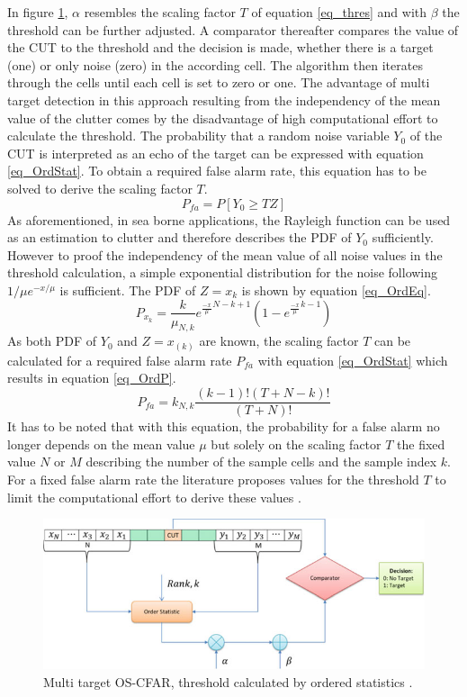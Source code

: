    In figure \ref{fig_StatCFAR}, $\alpha$ resembles the scaling factor $T$ of equation \ref{eq_thres} and with $\beta$ the threshold can be further adjusted. A comparator thereafter compares the value of the \ac{CUT} to the threshold and the decision is made, whether there is a target (one) or only noise (zero) in the according cell. The algorithm then iterates through the cells until each cell is set to zero or one. The advantage of multi target detection in this approach resulting from the independency of the mean value of the clutter comes by the disadvantage of high computational effort to calculate the threshold. The probability that a random noise variable $Y_0$ of the \ac{CUT} is interpreted as an echo of the target can be expressed with equation \ref{eq_OrdStat}. To obtain a required false alarm rate, this equation has to be solved to derive the scaling factor $T$. 
   \begin{equation}
   P_{fa}=P[Y_0\geq TZ]
   \label{eq_OrdStat}
   \end{equation}
   As aforementioned, in sea borne applications, the Rayleigh function can be used as an estimation to clutter and therefore describes the \ac{PDF} of $Y_0$ sufficiently. However to proof the independency of the mean value of all noise values in the threshold calculation, a simple exponential distribution for the noise following $1/\mu e^{-x/\mu}$ is sufficient. The \ac{PDF} of $Z=x_k$ is shown by equation \ref{eq_OrdEq}.
   \begin{equation}
   P_{x_k}= \frac{k}{\mu_{N,k}}{e^{\frac{-x}{\mu}}}^{N-k+1}({1-e^{\frac{-x}{\mu}}}^{k-1})
   \label{eq_OrdEq}
   \end{equation}
   As both \ac{PDF} of $Y_0$ and $Z=x_{(k)}$ are known, the scaling factor $T$ can be calculated for a required false alarm rate $P_{fa}$ with equation \ref{eq_OrdStat} which results in equation \ref{eq_OrdP}.
   \begin{equation}
   P_{fa}= k_{N,k}\frac{(k-1)!(T+N-k)!}{(T+N)!}
   \label{eq_OrdP}
   \end{equation}
   It has to be noted that with this equation, the probability for a false alarm no longer depends on the mean value $\mu$ but solely on the scaling factor $T$ the fixed value $N$ or $M$ describing the number of the sample cells and the sample index $k$. For a fixed false alarm rate the literature proposes values for the threshold $T$ to limit the computational effort to derive these values \cite{AdvCFAR}.
	\begin{figure}
		\begin{centering}
			\includegraphics[width=0.6\linewidth,keepaspectratio]{Bilder/StatCFAR.png}
			\caption{Multi target \ac{OS-CFAR}, threshold calculated by ordered statistics \cite{SigProcRADAR}.}
			\label{fig_StatCFAR}%
		\end{centering}
	\end{figure}
 
